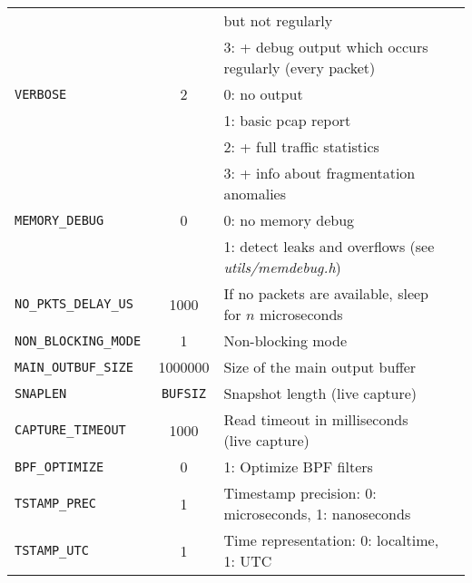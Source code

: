 \begin{longtable}{>{\tt}lcl>{\tt\small}l}
                             &                    & \qquad but not regularly                                            & \\
                             &                    & 3: + debug output which occurs regularly (every packet)             & \\
    VERBOSE                  & 2                  & 0: no output                                                        & \\
                             &                    & 1: basic pcap report                                                & \\
                             &                    & 2: + full traffic statistics                                        & \\
                             &                    & 3: + info about fragmentation anomalies                             & \\
    MEMORY\_DEBUG            & 0                  & 0: no memory debug                                                  & \\
                             &                    & 1: detect leaks and overflows (see {\em utils/memdebug.h})          & \\
    NO\_PKTS\_DELAY\_US      & 1000               & If no packets are available, sleep for $n$ microseconds             & \\
    NON\_BLOCKING\_MODE      & 1                  & Non-blocking mode                                                   & \\
    MAIN\_OUTBUF\_SIZE       & 1000000            & Size of the main output buffer                                      & \\
    SNAPLEN                  & {\small\tt BUFSIZ} & Snapshot length (live capture)                                      & \\
    CAPTURE\_TIMEOUT         & 1000               & Read timeout in milliseconds (live capture)                         & \\
    BPF\_OPTIMIZE            & 0                  & 1: Optimize BPF filters                                             & \\
    TSTAMP\_PREC             & 1                  & Timestamp precision: 0: microseconds, 1: nanoseconds                & \\
    TSTAMP\_UTC              & 1                  & Time representation: 0: localtime, 1: UTC                           & \\

\end{longtable}
